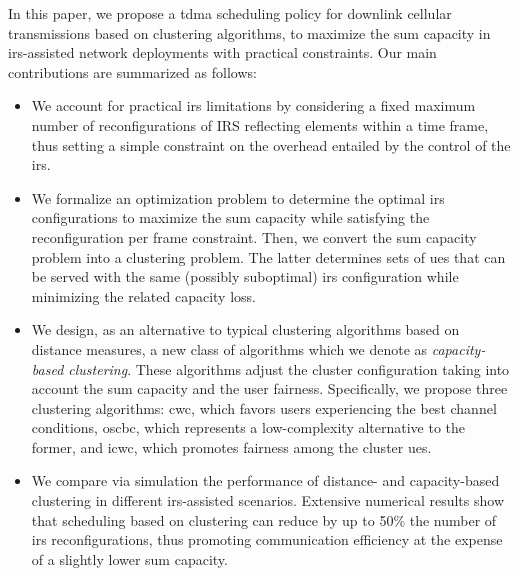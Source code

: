 In this paper, we propose a \gls{tdma} scheduling policy for downlink cellular transmissions based on clustering algorithms, to maximize the sum capacity in \gls{irs}-assisted network deployments with practical constraints.
Our main contributions are summarized as follows:
\begin{itemize}%
    \item We account for practical \gls{irs} limitations by considering a fixed maximum number of reconfigurations of IRS reflecting elements within a time frame, thus setting a simple constraint on the overhead entailed by the control of the \gls{irs}.
    \item We formalize an optimization problem to determine the optimal \gls{irs} configurations to maximize the sum capacity while satisfying the reconfiguration per frame constraint. Then, we convert the sum capacity problem into a clustering problem. The latter determines sets of \glspl{ue} that can be served with the same (possibly suboptimal) \gls{irs} configuration while minimizing the related capacity loss. %
    \item We design, as an alternative to typical clustering algorithms based on distance measures, a new class of algorithms which we denote as \textit{capacity-based clustering}. These algorithms adjust the cluster configuration taking into account the sum capacity and the user fairness.
     Specifically, we propose three clustering algorithms: \gls{cwc}, which favors users experiencing the best channel conditions, %
     \gls{oscbc}, which represents a low-complexity alternative to the former, and \gls{icwc}, which promotes fairness among the cluster \glspl{ue}.
    \item We compare via simulation the performance of distance- and capacity-based clustering in different \gls{irs}-assisted scenarios.
    Extensive numerical results show that scheduling based on clustering can reduce by up to 50\% the number of \gls{irs} reconfigurations, thus promoting communication efficiency at the expense of a slightly lower sum capacity. 
\end{itemize}
